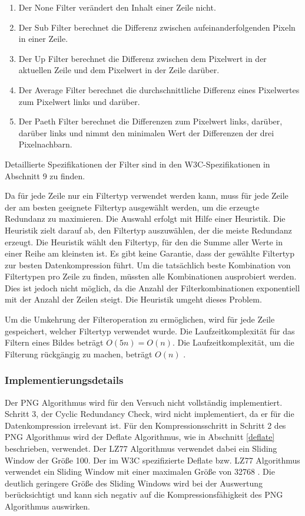 \documentclass[conference]{IEEEtran}
\begin{document}
\begin{enumerate}
  \item Der None Filter verändert den Inhalt einer Zeile nicht.
  \item Der Sub Filter berechnet die Differenz zwischen aufeinanderfolgenden Pixeln 
  in einer Zeile.
  \item Der Up Filter berechnet die Differenz zwischen dem Pixelwert in der aktuellen Zeile 
  und dem Pixelwert in der Zeile darüber.
  \item Der Average Filter berechnet die durchschnittliche Differenz eines Pixelwertes zum
  Pixelwert links und darüber.
  \item Der Paeth Filter berechnet die Differenzen zum Pixelwert links, darüber, darüber 
  links und nimmt den minimalen Wert der Differenzen der drei Pixelnachbarn.
\end{enumerate}

Detaillierte Spezifikationen der Filter sind in den W3C-Spezifikationen \cite{w3c} in 
Abschnitt 9 zu finden. 

Da für jede Zeile nur ein Filtertyp verwendet werden kann, muss für jede Zeile der am 
besten geeignete Filtertyp ausgewählt werden, um die erzeugte Redundanz zu maximieren. 
Die Auswahl erfolgt mit Hilfe einer Heuristik. 
Die Heuristik zielt darauf ab, den Filtertyp auszuwählen, der die meiste Redundanz erzeugt. 
Die Heuristik wählt den Filtertyp, für den die Summe aller Werte in einer Reihe am 
kleinsten ist. 
Es gibt keine Garantie, dass der gewählte Filtertyp zur besten Datenkompression führt. 
Um die tatsächlich beste Kombination von Filtertypen pro Zeile zu finden, müssten alle 
Kombinationen ausprobiert werden. 
Dies ist jedoch nicht möglich, da die Anzahl der Filterkombinationen exponentiell mit 
der Anzahl der Zeilen steigt. Die Heuristik umgeht dieses Problem. 

Um die Umkehrung der Filteroperation zu ermöglichen, wird für jede Zeile gespeichert, 
welcher Filtertyp verwendet wurde. 
Die Laufzeitkomplexität für das Filtern eines Bildes beträgt $O(5n) = O(n)$. 
Die Laufzeitkomplexität, um die Filterung rückgängig zu machen, beträgt $O(n)$ \cite{nick}. 


\subsubsection{Implementierungsdetails}

Der PNG Algorithmus wird für den Versuch nicht vollständig implementiert.
Schritt 3, der Cyclic Redundancy Check, wird nicht implementiert, da
er für die Datenkompression irrelevant ist.
Für den Kompressionsschritt in Schritt 2 des PNG Algorithmus wird der Deflate
Algorithmus, wie in Abschnitt \ref{deflate} beschrieben, verwendet.
Der LZ77 Algorithmus verwendet dabei ein Sliding Window der Größe 100.
Der im W3C spezifizierte Deflate bzw. LZ77 Algorithmus verwendet ein Sliding 
Window mit einer maximalen Größe von 32768 \cite{w3c}.
Die deutlich geringere Größe des Sliding Windows wird bei der Auswertung 
berücksichtigt und kann sich negativ auf die Kompressionsfähigkeit des 
PNG Algorithmus auswirken.
\end{document}
